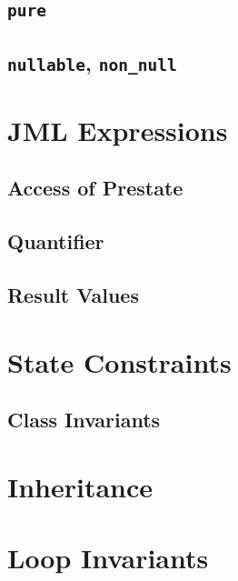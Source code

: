 \documentclass[a4paper, 11pt, accentcolor = tud3b]{tudreport}
\begin{document}
			\subsection{\texttt{pure}} %

			\subsection{\texttt{nullable}, \texttt{non\_null}} %

		\section{JML Expressions} %

			\subsection{Access of Prestate} %

			\subsection{Quantifier} %

			\subsection{Result Values} %

		\section{State Constraints} %

			\subsection{Class Invariants} %

		\section{Inheritance} %

		\section{Loop Invariants} %
\end{document}
